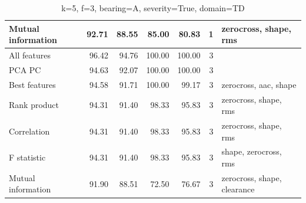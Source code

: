 \begin{table}[h]
\begin{adjustbox}{width=\textwidth}
\begin{tabular}{|l|rr|rr|r|l|}
Mutual information                    & \multicolumn{1}{r|}{92.71}          & 88.55                              & \multicolumn{1}{r|}{85.00}          & 80.83                              & 1                                                   & zerocross, shape, rms                   \\ \hline
All features                          & \multicolumn{1}{r|}{96.42}          & 94.76                              & \multicolumn{1}{r|}{100.00}         & 100.00                             & 3                                                   &                                         \\ \hline
PCA PC                                & \multicolumn{1}{r|}{94.63}          & 92.07                              & \multicolumn{1}{r|}{100.00}         & 100.00                             & 3                                                   &                                         \\ \hline
Best features                         & \multicolumn{1}{r|}{94.58}          & 91.71                              & \multicolumn{1}{r|}{100.00}         & 99.17                              & 3                                                   & zerocross, aac, shape                   \\ \hline
Rank product                          & \multicolumn{1}{r|}{94.31}          & 91.40                              & \multicolumn{1}{r|}{98.33}          & 95.83                              & 3                                                   & zerocross, shape, rms                   \\ \hline
Correlation                           & \multicolumn{1}{r|}{94.31}          & 91.40                              & \multicolumn{1}{r|}{98.33}          & 95.83                              & 3                                                   & zerocross, shape, rms                   \\ \hline
F statistic                           & \multicolumn{1}{r|}{94.31}          & 91.40                              & \multicolumn{1}{r|}{98.33}          & 95.83                              & 3                                                   & shape, zerocross, rms                   \\ \hline
Mutual information                    & \multicolumn{1}{r|}{91.90}          & 88.51                              & \multicolumn{1}{r|}{72.50}          & 76.67                              & 3                                                   & zerocross, shape, clearance             \\ \hline
\end{tabular}
\end{adjustbox}
\caption{k=5, f=3, bearing=A, severity=True, domain=TD}
\end{table}



